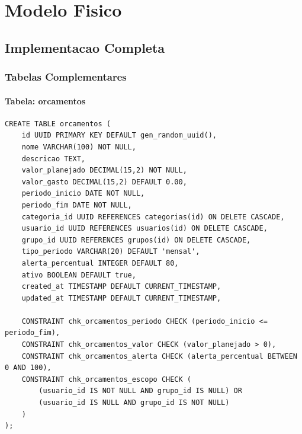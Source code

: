 \section{Modelo Fisico}

\subsection{Implementacao Completa}

\subsubsection{Tabelas Complementares}

\paragraph{Tabela: orcamentos}
\begin{lstlisting}[caption=Estrutura da tabela orcamentos]
CREATE TABLE orcamentos (
    id UUID PRIMARY KEY DEFAULT gen_random_uuid(),
    nome VARCHAR(100) NOT NULL,
    descricao TEXT,
    valor_planejado DECIMAL(15,2) NOT NULL,
    valor_gasto DECIMAL(15,2) DEFAULT 0.00,
    periodo_inicio DATE NOT NULL,
    periodo_fim DATE NOT NULL,
    categoria_id UUID REFERENCES categorias(id) ON DELETE CASCADE,
    usuario_id UUID REFERENCES usuarios(id) ON DELETE CASCADE,
    grupo_id UUID REFERENCES grupos(id) ON DELETE CASCADE,
    tipo_periodo VARCHAR(20) DEFAULT 'mensal',
    alerta_percentual INTEGER DEFAULT 80,
    ativo BOOLEAN DEFAULT true,
    created_at TIMESTAMP DEFAULT CURRENT_TIMESTAMP,
    updated_at TIMESTAMP DEFAULT CURRENT_TIMESTAMP,
    
    CONSTRAINT chk_orcamentos_periodo CHECK (periodo_inicio <= periodo_fim),
    CONSTRAINT chk_orcamentos_valor CHECK (valor_planejado > 0),
    CONSTRAINT chk_orcamentos_alerta CHECK (alerta_percentual BETWEEN 0 AND 100),
    CONSTRAINT chk_orcamentos_escopo CHECK (
        (usuario_id IS NOT NULL AND grupo_id IS NULL) OR
        (usuario_id IS NULL AND grupo_id IS NOT NULL)
    )
);
\end{lstlisting}

